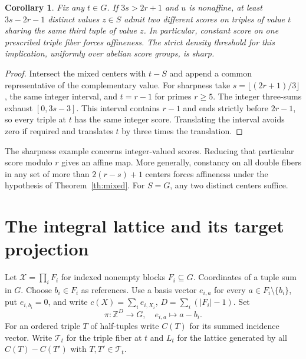 \documentclass[11pt]{article}
\newtheorem{corollary}[theorem]{Corollary}
\newcommand{\Z}{\mathbb Z}
\begin{document}
\begin{corollary}\label{cor:third}
Fix any $t\in G$. If $3s>2r+1$ and $u$ is nonaffine, at least $3s-2r-1$ distinct values $z\in S$ admit two different scores on triples of value $t$ sharing the \emph{same third tuple} of value $z$. In particular, constant score on one prescribed triple fiber forces affineness. The strict density threshold for this implication, uniformly over abelian score groups, is sharp.
\end{corollary}
\begin{proof}
Intersect the mixed centers with $t-S$ and append a common representative of the complementary value. For sharpness take $s=\lfloor(2r+1)/3\rfloor$, the same integer interval, and $t=r-1$ for primes $r\ge5$. The integer three-sums exhaust $[0,3s-3]$. This interval contains $r-1$ and ends strictly before $2r-1$, so every triple at $t$ has the same integer score. Translating the interval avoids zero if required and translates $t$ by three times the translation.
\end{proof}

The sharpness example concerns integer-valued scores. Reducing that particular score modulo $r$ gives an affine map. More generally, constancy on all double fibers in any set of more than $2(r-s)+1$ centers forces affineness under the hypothesis of Theorem~\ref{th:mixed}. For $S=G$, any two distinct centers suffice.

\section{The integral lattice and its target projection}
Let $\mathcal X=\prod_i F_i$ for indexed nonempty blocks $F_i\subseteq G$. Coordinates of a tuple sum in $G$. Choose $b_i\in F_i$ as references. Use a basis vector $e_{i,a}$ for every $a\in F_i\setminus\{b_i\}$, put $e_{i,b_i}=0$, and write $c(X)=\sum_i e_{i,X_i}$, $D=\sum_i(|F_i|-1)$. Set
\[
 \pi:\Z^D\to G,\quad e_{i,a}\mapsto a-b_i.
\]
For an ordered triple $T$ of half-tuples write $C(T)$ for its summed incidence vector. Write $\mathcal T_t$ for the triple fiber at $t$ and $L_t$ for the lattice generated by all $C(T)-C(T')$ with $T,T'\in\mathcal T_t$.
\end{document}
